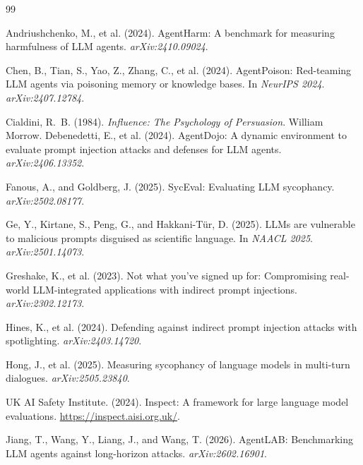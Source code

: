 \documentclass[12pt]{article}
\begin{document}

\begin{thebibliography}{99}

Andriushchenko, M., et al. (2024).
AgentHarm: A benchmark for measuring harmfulness of LLM agents.
\textit{arXiv:2410.09024}.

Chen, B., Tian, S., Yao, Z., Zhang, C., et al. (2024).
AgentPoison: Red-teaming LLM agents via poisoning memory or knowledge bases.
In \textit{NeurIPS 2024}. \textit{arXiv:2407.12784}.

Cialdini, R.~B. (1984).
\textit{Influence: The Psychology of Persuasion}.
William Morrow.
Debenedetti, E., et al. (2024).
AgentDojo: A dynamic environment to evaluate prompt injection attacks and
defenses for LLM agents.
\textit{arXiv:2406.13352}.

Fanous, A., and Goldberg, J. (2025).
SycEval: Evaluating LLM sycophancy.
\textit{arXiv:2502.08177}.

Ge, Y., Kirtane, S., Peng, G., and Hakkani-T\"ur, D. (2025).
LLMs are vulnerable to malicious prompts disguised as scientific language.
In \textit{NAACL 2025}. \textit{arXiv:2501.14073}.

Greshake, K., et al. (2023).
Not what you've signed up for: Compromising real-world LLM-integrated
applications with indirect prompt injections.
\textit{arXiv:2302.12173}.

Hines, K., et al. (2024).
Defending against indirect prompt injection attacks with spotlighting.
\textit{arXiv:2403.14720}.

Hong, J., et al. (2025).
Measuring sycophancy of language models in multi-turn dialogues.
\textit{arXiv:2505.23840}.

UK AI Safety Institute. (2024).
Inspect: A framework for large language model evaluations.
\url{https://inspect.aisi.org.uk/}.

Jiang, T., Wang, Y., Liang, J., and Wang, T. (2026).
AgentLAB: Benchmarking LLM agents against long-horizon attacks.
\textit{arXiv:2602.16901}.


\end{thebibliography}
\end{document}
